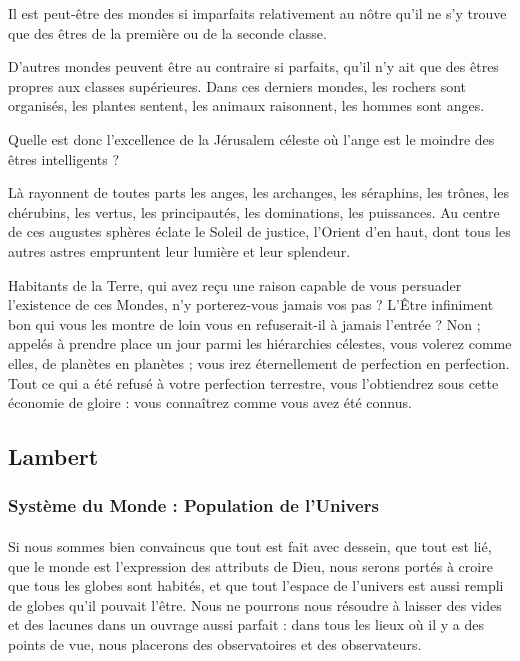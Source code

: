 \documentclass[a4paper, 11pt, oneside]{article}
\begin{document}
Il est peut-être des mondes si imparfaits relativement au nôtre qu'il ne s'y trouve que des êtres de la première ou de la seconde classe.

D'autres mondes peuvent être au contraire si parfaits, qu'il n'y ait que des êtres propres aux classes supérieures. Dans ces derniers mondes, les rochers sont organisés, les plantes sentent, les animaux raisonnent, les hommes sont anges.

Quelle est donc l'excellence de la Jérusalem céleste où l'ange est le moindre des êtres intelligents ?

Là rayonnent de toutes parts les anges, les archanges, les séraphins, les trônes, les chérubins, les vertus, les principautés, les dominations, les puissances. Au centre de ces augustes sphères éclate le Soleil de justice, l'Orient d'en haut, dont tous les autres astres empruntent leur lumière et leur splendeur.

Habitants de la Terre, qui avez reçu une raison capable de vous persuader l'existence de ces Mondes, n'y porterez-vous jamais vos pas ? L'Être infiniment bon qui vous les montre de loin vous en refuserait-il à jamais l'entrée ? Non ; appelés à prendre place un jour parmi les hiérarchies célestes, vous volerez comme elles, de planètes en planètes ; vous irez éternellement de perfection en perfection. Tout ce qui a été refusé à votre perfection terrestre, vous l'obtiendrez sous cette économie de gloire : vous connaîtrez comme vous avez été connus.
\clearpage
\subsection{Lambert}
\subsubsection{Système du Monde : Population de l'Univers}
\paragraph{}
Si nous sommes bien convaincus que tout est fait avec dessein, que tout est lié, que le monde est l'expression des attributs de Dieu, nous serons portés à croire que tous les globes sont habités, et que tout l'espace de l'univers est aussi rempli de globes qu'il pouvait l'être. Nous ne pourrons nous résoudre à laisser des vides et des lacunes dans un ouvrage aussi parfait : dans tous les lieux où il y a des points de vue, nous placerons des observatoires et des observateurs.
\end{document}
